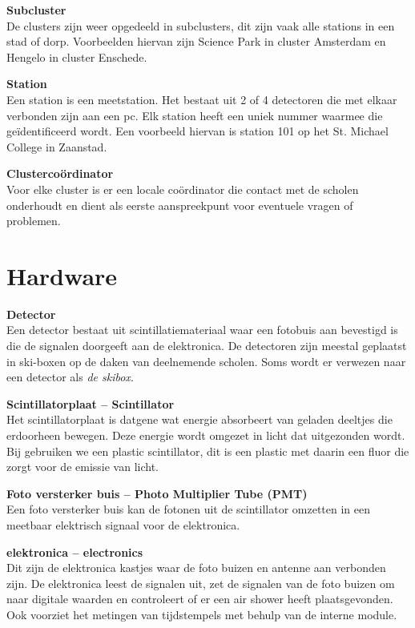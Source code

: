 \textbf{Subcluster} \\
De clusters zijn weer opgedeeld in subclusters, dit zijn vaak alle
stations in een stad of dorp. Voorbeelden hiervan zijn Science Park in
cluster Amsterdam en Hengelo in cluster Enschede.

\textbf{Station} \\
Een station is een meetstation. Het bestaat uit 2 of 4 detectoren die met elkaar
verbonden zijn aan een pc. Elk station heeft een uniek nummer waarmee
die geïdentificeerd wordt. Een voorbeeld hiervan is station 101 op het
St. Michael College in Zaanstad.

\textbf{Clustercoördinator} \\
Voor elke cluster is er een locale coördinator die contact met de
scholen onderhoudt en dient als eerste aanspreekpunt voor eventuele
vragen of problemen.


\section{Hardware}

\textbf{Detector} \\
Een detector bestaat uit scintillatiemateriaal waar een fotobuis aan
bevestigd is die de signalen doorgeeft aan de \hisparc elektronica. De
detectoren zijn meestal geplaatst in ski-boxen op de daken van
deelnemende scholen. Soms wordt er verwezen naar een detector als
\emph{de skibox}.

\textbf{Scintillatorplaat -- Scintillator} \\
Het scintillatorplaat is datgene wat energie absorbeert van geladen
deeltjes die erdoorheen bewegen. Deze energie wordt omgezet in licht dat
uitgezonden wordt. Bij \hisparc gebruiken we een plastic scintillator,
dit is een plastic met daarin een fluor die zorgt voor de emissie van licht.

\textbf{Foto versterker buis -- Photo Multiplier Tube (PMT)} \\
Een foto versterker buis kan de fotonen uit de scintillator omzetten in
een meetbaar elektrisch signaal voor de \hisparc elektronica.

\textbf{\hisparc elektronica -- \hisparc electronics} \\
Dit zijn de elektronica kastjes waar de foto buizen en \gps antenne aan
verbonden zijn. De elektronica leest de signalen uit, zet de signalen van
de foto buizen om naar digitale waarden en controleert of er een air
shower heeft plaatsgevonden. Ook voorziet het metingen van tijdstempels
met behulp van de interne \gps module.

